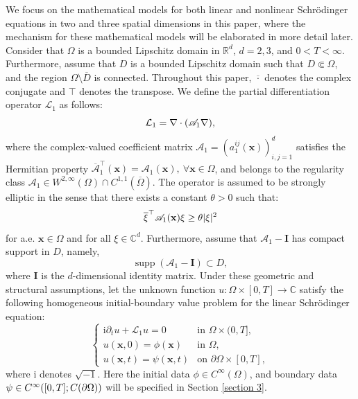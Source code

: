 \documentclass[11pt,reqno,oneside]{amsart}
\numberwithin{equation}{section}
\theoremstyle{definition}
\theoremstyle{remark}
\numberwithin{equation}{section}
\begin{document}
We focus on the mathematical models for both linear and nonlinear Schr\"{o}dinger equations in two and three spatial dimensions in this paper, where the mechanism for these mathematical models will be elaborated in more detail later. Consider that $\Omega$ is a bounded Lipschitz domain in $\mathbb{R}^d$, $d=2, 3$, and $0 < T < \infty$. Furthermore, assume that $D$ is a bounded Lipschitz domain such that $D \Subset \Omega$, and the region $\Omega \setminus \overline{D}$ is connected. Throughout this paper, $\overline{\cdot}$ denotes the complex conjugate and $\top$ denotes the transpose. We define the partial differentiation operator $\mathcal{L}_1$ as follows:
\begin{equation}\notag
    \mathcal{L}_1 = 
\nabla \cdot (\mathscr{A}_1 
\nabla ),
\end{equation}
where the complex-valued coefficient matrix $\mathscr{A}_1 = (a_1^{ij}(\mathbf{x}))_{i,j=1}^d$ satisfies the Hermitian property $\overline{\mathscr{A}}_1^{\top}(\mathbf{x}) = \mathscr{A}_1(\mathbf{x}), ~\forall \mathbf{x} \in \Omega$, and belongs to the regularity class $\mathscr{A}_1 \in W^{2,\infty}(\Omega) \cap C^{1,1}(\overline{\Omega})$. The operator is assumed to be strongly elliptic in the sense that there exists a constant $\theta > 0$ such that:
\begin{equation}\notag
    \overline{\xi}^{\top} \mathscr{A}_1(\mathbf{x}) \xi \geq \theta |\xi|^{2}
\end{equation}
for a.e. $\mathbf{x} \in \Omega$ and for all $\xi \in \mathbb{C}^d$. Furthermore, assume that $\mathscr{A}_1- \mathbf{I}$ has compact support in $D$, namely,
		\begin{equation*}\label{compact support}
			\operatorname{supp}(\mathscr{A}_1 - \mathbf{I}) \subset D,
		\end{equation*}
        where $\mathbf{I}$ is the $d$-dimensional  identity matrix. 
        Under these geometric and structural assumptions, let the unknown function $u: \Omega \times [0,T] \rightarrow \mathbb{C}$ satisfy the following homogeneous initial-boundary value problem for the linear Schr\"{o}dinger equation:
\begin{equation}\label{1.1}
    \begin{cases}
        \mathrm{i}\partial_t u + \mathcal{L}_1 u = 0 & \text{in } \Omega \times (0,T], \\
        u(\mathbf{x},0) = \phi(\mathbf{x}) & \text{in } \Omega, \\
        u(\mathbf{x},t) = \psi(\mathbf{x},t) & \text{on } \partial\Omega \times [0,T],
    \end{cases}
\end{equation}
where $\mathrm{i}$ denotes $\sqrt{-1}$. Here the initial data $\phi\in C^{\infty}{(\Omega)}$, and boundary data $\psi \in C^\infty([0, T];\\ C(\partial \Omega))$ will be specified in Section \ref{section 3}.
\end{document}
